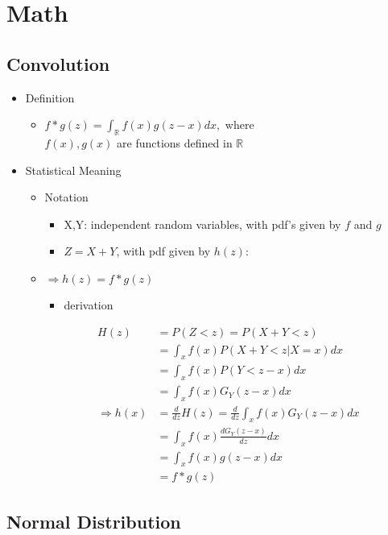 \chapter{Math}

\section{Convolution}

\begin{itemize}
\item Definition
	\begin{itemize}
	\item $\displaystyle f* g (z) = \int_{\mathbb R}f(x)g(z-x) dx,$ where \\
	$f(x),g(x)$ are functions defined in $\mathbb R$
	\end{itemize}
	
\item Statistical Meaning
	\begin{itemize}
	\item Notation
		\begin{itemize}
		\item X,Y: independent random variables, with pdf's given by $f$ and $g$
		\item $Z = X+Y$, with pdf given by $h(z)$:
		\end{itemize}
		
	\item $\Rightarrow h(z) = f * g (z)$
		\begin{itemize}
		\item derivation
		\end{itemize}
	\begin{align*} H(z) &= P(Z<z) = P(X+Y<z) \\ &= \int_x f(x)P(X+Y<z|X=x) dx \\ &= \int_x f(x)P(Y<z-x)dx \\ &= \int_x f(x)G_Y(z-x)dx \\ \Rightarrow h(x) &= \frac d {dz} H(z) = \frac d {dz} \int_x f(x)G_Y(z-x)dx \\ &= \int_x f(x) \frac {dG_Y(z-x)}{dz} dx \\ &= \int_x f(x) g(z-x)dx \\ &= f * g (z) \end{align*}
	
	\end{itemize}
\end{itemize}
 
 \section{Normal Distribution}
 
